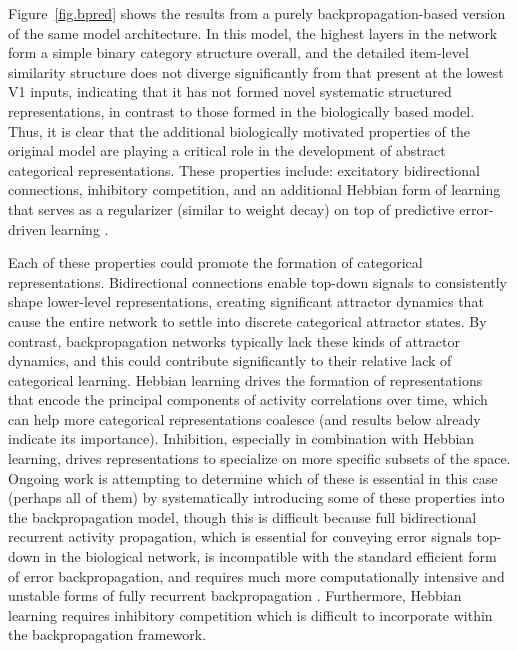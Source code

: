 \documentclass[12pt,twoside]{nature}
\newif\myifpdf
\begin{document}
Figure~\ref{fig.bpred} shows the results from a purely backpropagation-based version of the same model architecture.  In this model, the highest layers in the network form a simple binary category structure overall, and the detailed item-level similarity structure does not diverge significantly from that present at the lowest V1 inputs, indicating that it has not formed novel systematic structured representations, in contrast to those formed in the biologically based model.  Thus, it is clear that the additional biologically motivated properties of the original model are playing a critical role in the development of abstract categorical representations. These properties include: excitatory bidirectional connections, inhibitory competition, and an additional Hebbian form of learning that serves as a regularizer (similar to weight decay) on top of predictive error-driven learning \cite{OReilly98,OReillyMunakata00}.

Each of these properties could promote the formation of categorical representations. Bidirectional connections enable top-down signals to consistently shape lower-level representations, creating significant attractor dynamics that cause the entire network to settle into discrete categorical attractor states. By contrast, backpropagation networks typically lack these kinds of attractor dynamics, and this could contribute significantly to their relative lack of categorical learning.  Hebbian learning drives the formation of representations that encode the principal components of activity correlations over time, which can help more categorical representations coalesce (and results below already indicate its importance).  Inhibition, especially in combination with Hebbian learning, drives representations to specialize on more specific subsets of the space.  Ongoing work is attempting to determine which of these is essential in this case (perhaps all of them) by systematically introducing some of these properties into the backpropagation model, though this is difficult because full bidirectional recurrent activity propagation, which is essential for conveying error signals top-down in the biological network, is incompatible with the standard efficient form of error backpropagation, and requires much more computationally intensive and unstable forms of fully recurrent backpropagation \cite{WilliamsZipser92,Pineda87}.  Furthermore, Hebbian learning requires inhibitory competition which is difficult to incorporate within the backpropagation framework.
\end{document}
